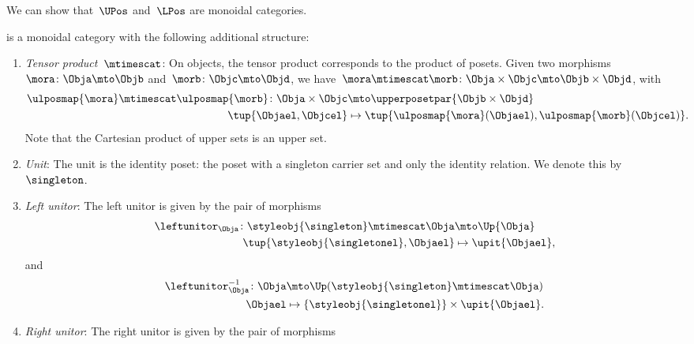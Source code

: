We can show that~$\UPos$ and~$\LPos$ are monoidal categories.


\begin{lemma}
\label{lem:upos_moncat}
\UPos is a monoidal category with the following additional structure:
\begin{enumerate}
    \item \emph{Tensor product~$\mtimescat$}: On objects, the tensor product corresponds to the product of posets.
    Given two morphisms~$\mora\colon \Obja\mto \Objb$ and~$\morb\colon \Objc\mto \Objd$, we have~$\mora \mtimescat \morb\colon  \Obja \times \Objc \mto \Objb\times \Objd$, with
    \begin{equation}
    \begin{aligned}
        \ulposmap{\mora} \mtimescat \ulposmap{\morb}\colon \Obja \times \Objc &\mto \upperposetpar{\Objb\times \Objd}\\
        \tup{\Objael,\Objcel}&\mapsto \tup{\ulposmap{\mora}(\Objael), \ulposmap{\morb}(\Objcel)}.
    \end{aligned}
    \end{equation}
    Note that the Cartesian product of upper sets is an upper set.
    \item \emph{Unit}: The unit is the identity poset: the poset with a singleton carrier set and only the identity relation.
    We denote this by~$\singleton$.
    \item \emph{Left unitor}: The left unitor is given by the pair of morphisms
    \begin{equation}
        \begin{aligned}
            \leftunitor_\Obja\colon \styleobj{\singleton}\mtimescat \Obja &\mto \Up{\Obja}\\
            \tup{\styleobj{\singletonel},\Objael}&\mapsto \upit\{\Objael\},
        \end{aligned}
    \end{equation}
    and
    \begin{equation}
        \begin{aligned}
            \leftunitor_\Obja^{-1}\colon \Obja &\mto \Up(\styleobj{\singleton}\mtimescat \Obja) \\
            \Objael&\mapsto \{\styleobj{\singletonel}\} \times \upit \{\Objael\}.
        \end{aligned}
    \end{equation}
    \item \emph{Right unitor}: The right unitor is given by the pair of morphisms

\end{enumerate}
\end{lemma}
